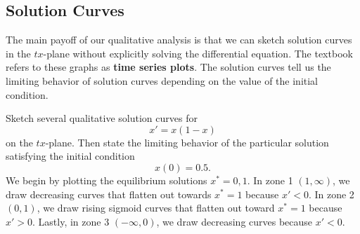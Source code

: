 \documentclass[09pt,letterpaper]{article}
\begin{document}
\subsection{Solution Curves}
The main payoff of our qualitative analysis is that we can sketch solution
curves in the $tx$-plane without explicitly solving the differential
equation. The textbook refers to these graphs as \textbf{time series plots}. The solution curves tell us the limiting behavior of solution curves depending on the value of the initial condition. 

\begin{example}[5]{
Sketch several qualitative solution curves for
$$
x' = x(1-x)
$$
on the $tx$-plane. Then state the limiting behavior of the particular solution satisfying the initial condition
$$
x(0)=0.5.
$$
}
We begin by plotting the equilibrium solutions $x^*= 0,1$. In zone 1 $(1,\infty)$, we draw decreasing curves that flatten out towards $x^*=1$ because $x'<0$. In zone 2 $(0,1)$, we draw rising sigmoid curves that flatten out toward $x^*=1$ because $x'>0$. Lastly, in zone 3 $(-\infty,0)$, we draw decreasing curves because $x'<0$.  

\begin{figure}[H]
\centering
{}
\end{figure}
\end{example}
\end{document}
